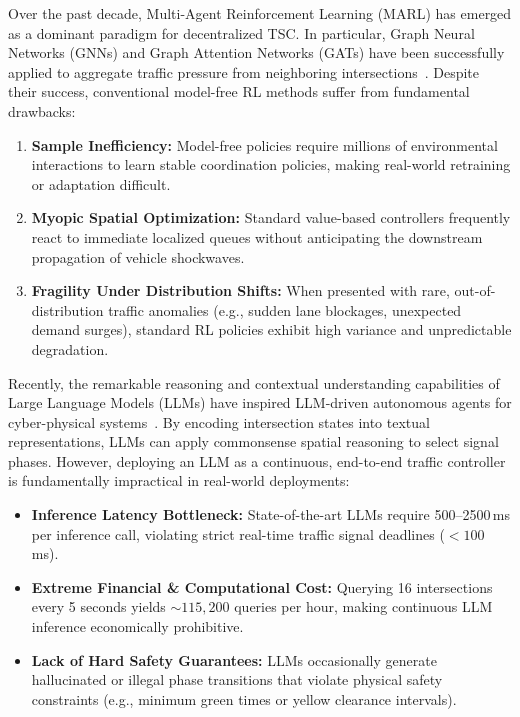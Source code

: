 \documentclass[11pt,a4paper]{article}
\begin{document}
Over the past decade, Multi-Agent Reinforcement Learning (MARL) has emerged as a dominant paradigm for decentralized TSC. In particular, Graph Neural Networks (GNNs) and Graph Attention Networks (GATs) have been successfully applied to aggregate traffic pressure from neighboring intersections~\cite{velickovic2018graph,wei2019colight,brody2022gatv2}. Despite their success, conventional model-free RL methods suffer from fundamental drawbacks:
\begin{enumerate}
    \item \textbf{Sample Inefficiency:} Model-free policies require millions of environmental interactions to learn stable coordination policies, making real-world retraining or adaptation difficult.
    \item \textbf{Myopic Spatial Optimization:} Standard value-based controllers frequently react to immediate localized queues without anticipating the downstream propagation of vehicle shockwaves.
    \item \textbf{Fragility Under Distribution Shifts:} When presented with rare, out-of-distribution traffic anomalies (e.g., sudden lane blockages, unexpected demand surges), standard RL policies exhibit high variance and unpredictable degradation.
\end{enumerate}

Recently, the remarkable reasoning and contextual understanding capabilities of Large Language Models (LLMs) have inspired LLM-driven autonomous agents for cyber-physical systems~\cite{wang2024survey,lai2024llmlight}. By encoding intersection states into textual representations, LLMs can apply commonsense spatial reasoning to select signal phases. However, deploying an LLM as a continuous, end-to-end traffic controller is fundamentally impractical in real-world deployments:
\begin{itemize}
    \item \textbf{Inference Latency Bottleneck:} State-of-the-art LLMs require 500--2500\,ms per inference call, violating strict real-time traffic signal deadlines ($<100$\,ms).
    \item \textbf{Extreme Financial \& Computational Cost:} Querying 16 intersections every 5 seconds yields $\sim 115,200$ queries per hour, making continuous LLM inference economically prohibitive.
    \item \textbf{Lack of Hard Safety Guarantees:} LLMs occasionally generate hallucinated or illegal phase transitions that violate physical safety constraints (e.g., minimum green times or yellow clearance intervals).
\end{itemize}
\end{document}
